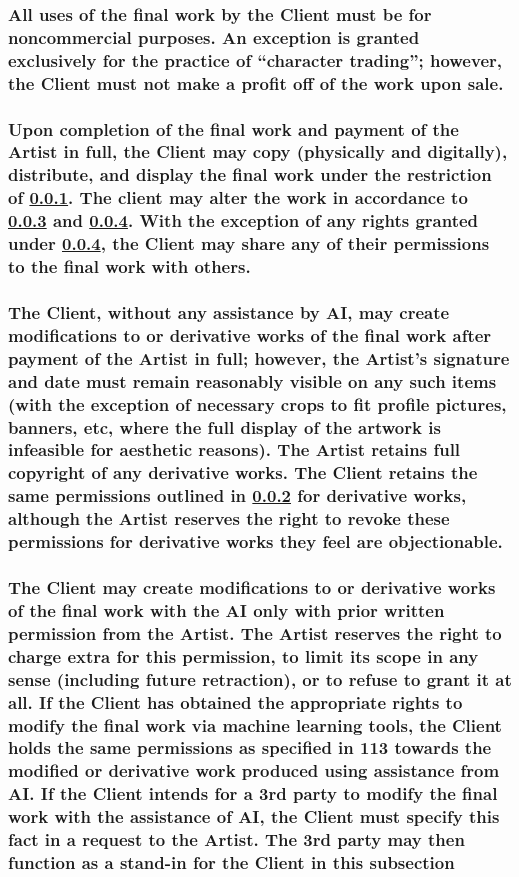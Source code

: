 \documentclass{article}
\begin{document}
\begin{flushleft}
		\subsubsection[Commercial Use Restriction]{\normalfont All uses of the final work by the Client must be for noncommercial purposes. An exception is granted exclusively for the practice of ``character trading''; however, the Client must not make a profit off of the work upon sale.}\label{clientnoncommercial}
		\hphantom{owo}

		\subsubsection[Client Limited Copyright]{\normalfont Upon completion of the final work and payment of the Artist in full, the Client may copy (physically and digitally), distribute, and display the final work under the restriction of \ref{clientnoncommercial}. The client may alter the work in accordance to \ref{clientderivative} and  \ref{clientai}. With the exception of any rights granted under \ref{clientai}, the Client may share any of their permissions to the final work with others.}\label{clientperms}

		\subsubsection[Derivative Works]{\normalfont The Client, without any assistance by AI, may create modifications to or derivative works of the final work after payment of the Artist in full; however, the Artist's signature and date must remain reasonably visible on any such items (with the exception of necessary crops to fit profile pictures, banners, etc, where the full display of the artwork is infeasible for aesthetic reasons). The Artist retains full copyright of any derivative works. The Client retains the same permissions outlined in \ref{clientperms} for derivative works, although the Artist reserves the right to revoke these permissions for derivative works they feel are objectionable.}\label{clientderivative}

		\subsubsection[Client AI Policy]{\normalfont The Client may create modifications to or derivative works of the final work with the AI only with prior written permission from the Artist. The Artist reserves the right to charge extra for this permission, to limit its scope in any sense (including future retraction), or to refuse to grant it at all. If the Client has obtained the appropriate rights to modify the final work via machine learning tools, the Client holds the same permissions as specified in 113 towards the modified or derivative work produced using assistance from AI. If the Client intends for a 3rd party to modify the final work with the assistance of AI, the Client must specify this fact in a request to the Artist. The 3rd party may then function as a stand-in for the Client in this subsection}\label{clientai}\hphantom{owo}


\end{flushleft}
\end{document}
